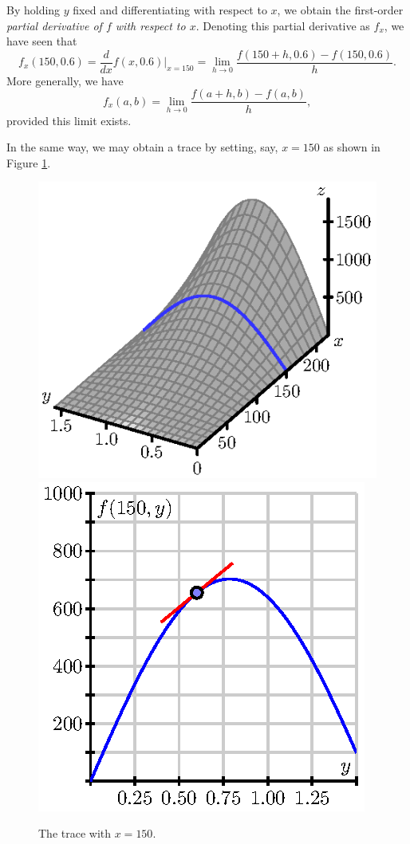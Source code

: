 By holding $y$ fixed and differentiating with respect to $x$, we
obtain the first-order {\em partial derivative of $f$ with respect to
  $x$}.  Denoting this partial derivative as $f_x$, we have seen that
$$
f_x(150, 0.6) = \frac{d}{dx}f(x,0.6)|_{x=150} = \lim_{h\to
  0}\frac{f(150+h, 0.6) - f(150, 0.6)}{h}.
$$
More generally, we have 
$$
f_x(a,b) = \lim_{h\to0} \frac{f(a+h, b)-f(a,b)}{h},
$$
provided this limit exists.

In the same way, we may obtain a trace by setting, say, $x=150$ as shown
in Figure \ref{F:10.2.trace.x}.
\begin{figure}[ht]
  \begin{center}
    \includegraphics{figures/fig_10_2_trace_x_a.eps}
    \hspace*{0.5in}
    \includegraphics{figures/fig_10_2_trace_x.eps}
  \end{center}
  \caption{The trace with $x = 150$.}
  \label{F:10.2.trace.x}
\end{figure}
